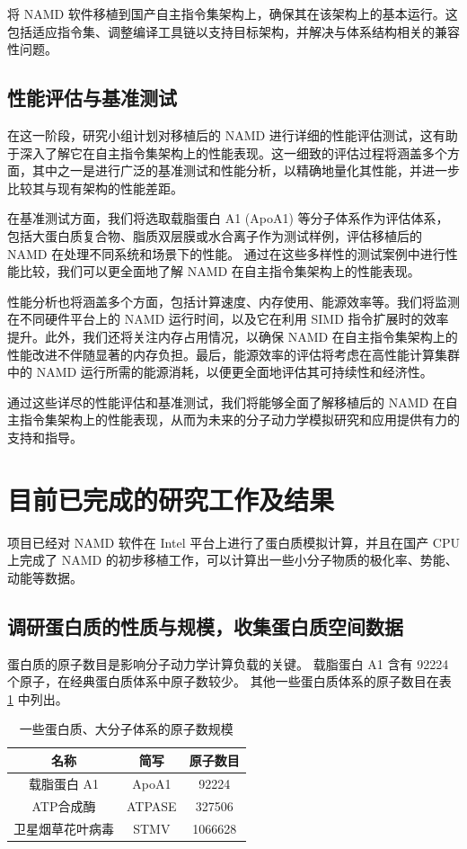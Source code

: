 将 NAMD 软件移植到国产自主指令集架构上，确保其在该架构上的基本运行。这包括适应指令集、调整编译工具链以支持目标架构，并解决与体系结构相关的兼容性问题。

\subsection{性能评估与基准测试}


在这一阶段，研究小组计划对移植后的 NAMD 进行详细的性能评估测试，这有助于深入了解它在自主指令集架构上的性能表现。这一细致的评估过程将涵盖多个方面，其中之一是进行广泛的基准测试和性能分析，以精确地量化其性能，并进一步比较其与现有架构的性能差距。

在基准测试方面，我们将选取载脂蛋白 A1 (ApoA1) 等分子体系作为评估体系，包括大蛋白质复合物、脂质双层膜或水合离子作为测试样例，评估移植后的 NAMD 在处理不同系统和场景下的性能。
通过在这些多样性的测试案例中进行性能比较，我们可以更全面地了解 NAMD 在自主指令集架构上的性能表现。

性能分析也将涵盖多个方面，包括计算速度、内存使用、能源效率等。我们将监测在不同硬件平台上的 NAMD 运行时间，以及它在利用 SIMD 指令扩展时的效率提升。此外，我们还将关注内存占用情况，以确保 NAMD 在自主指令集架构上的性能改进不伴随显著的内存负担。最后，能源效率的评估将考虑在高性能计算集群中的 NAMD 运行所需的能源消耗，以便更全面地评估其可持续性和经济性。

通过这些详尽的性能评估和基准测试，我们将能够全面了解移植后的 NAMD 在自主指令集架构上的性能表现，从而为未来的分子动力学模拟研究和应用提供有力的支持和指导。

\section{目前已完成的研究工作及结果}

项目已经对 NAMD 软件在 Intel 平台上进行了蛋白质模拟计算，并且在国产 CPU 上完成了 NAMD 的初步移植工作，可以计算出一些小分子物质的极化率、势能、动能等数据。

\subsection{调研蛋白质的性质与规模，收集蛋白质空间数据}

蛋白质的原子数目是影响分子动力学计算负载的关键。
载脂蛋白 A1 含有 92224 个原子，在经典蛋白质体系中原子数较少。
其他一些蛋白质体系的原子数目在表 \ref{tab:protein-size} 中列出。

\begin{table}[h]
    \centering
    \caption{一些蛋白质、大分子体系的原子数规模}
    \label{tab:protein-size}
    \begin{tabular}{ccc}
        \toprule
        名称       & 简写     & 原子数目    \\
        \midrule
        载脂蛋白 A1  & ApoA1  & 92224   \\
        ATP合成酶   & ATPASE & 327506  \\
        卫星烟草花叶病毒 & STMV   & 1066628 \\
        \bottomrule
    \end{tabular}
\end{table}

